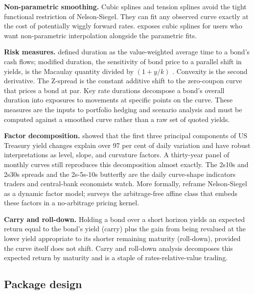 \textbf{Non-parametric smoothing.} Cubic splines
\citep{mcculloch1971measuring} and tension splines
\citep{fisher1995fitting} avoid the tight functional restriction of
Nelson-Siegel. They can fit any observed curve exactly at the cost of
potentially wiggly forward rates.  exposes
 cubic splines for users who want
non-parametric interpolation alongside the parametric fits.

\textbf{Risk measures.} \citet{macaulay1938movements} defined duration
as the value-weighted average time to a bond's cash flows; modified
duration, the sensitivity of bond price to a parallel shift in yields,
is the Macaulay quantity divided by \((1 + y/k)\)
\citep{hicks1939value}. Convexity is the second derivative. The Z-spread
is the constant additive shift to the zero-coupon curve that prices a
bond at par. Key rate durations \citep{ho1992key} decompose a bond's
overall duration into exposures to movements at specific points on the
curve. These measures are the inputs to portfolio hedging and scenario
analysis and must be computed against a smoothed curve rather than a raw
set of quoted yields.

\textbf{Factor decomposition.} \citet{litterman1991common} showed that
the first three principal components of US Treasury yield changes
explain over 97 per cent of daily variation and have robust
interpretations as level, slope, and curvature factors. A thirty-year
panel of monthly curves still reproduces this decomposition almost
exactly. The 2s10s and 2s30s spreads and the 2s-5s-10s butterfly are the
daily curve-shape indicators traders and central-bank economists watch.
More formally, \citet{diebold2006forecasting} reframe Nelson-Siegel as a
dynamic factor model; \citet{piazzesi2010affine} surveys the
arbitrage-free affine class that embeds these factors in a no-arbitrage
pricing kernel.

\textbf{Carry and roll-down.} Holding a bond over a short horizon yields
an expected return equal to the bond's yield (carry) plus the gain from
being revalued at the lower yield appropriate to its shorter remaining
maturity (roll-down), provided the curve itself does not shift. Carry
and roll-down analysis decomposes this expected return by maturity and
is a staple of rates-relative-value trading.

\subsection{Package design}\label{package-design}

